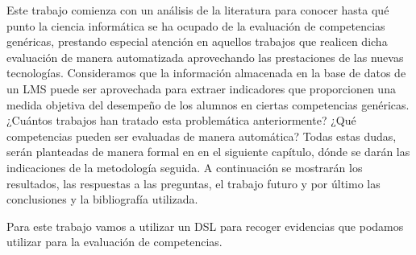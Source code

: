 
Este trabajo comienza con un análisis de la literatura para conocer hasta qué punto la ciencia informática se ha ocupado de la evaluación de competencias genéricas, prestando especial atención en aquellos trabajos que realicen dicha evaluación de manera automatizada aprovechando las prestaciones de las nuevas tecnologías. Consideramos que la información almacenada en la base de datos de un LMS puede ser aprovechada para extraer indicadores que proporcionen una medida objetiva del desempeño de los alumnos en ciertas competencias genéricas. ¿Cuántos trabajos han tratado esta problemática anteriormente? ¿Qué competencias pueden ser evaluadas de manera automática? Todas estas dudas, serán planteadas de manera formal en en el siguiente capítulo, dónde se darán las indicaciones de la metodología seguida. A continuación se mostrarán los resultados, las respuestas a las preguntas, el trabajo futuro y por último las conclusiones y la bibliografía utilizada.

Para este trabajo vamos a utilizar un DSL para recoger evidencias que podamos utilizar para la evaluación de competencias.